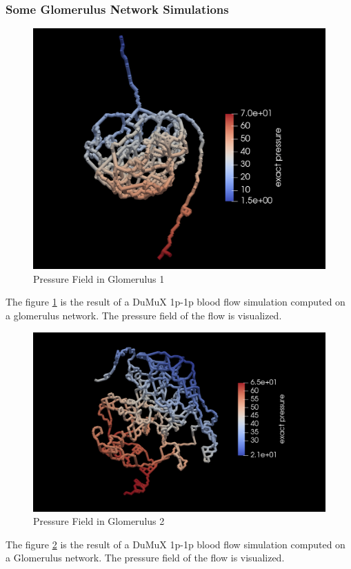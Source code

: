 \subsubsection*{Some Glomerulus Network Simulations}

\begin{figure}[h]
\centering
\includegraphics[width=162mm]{glom_pressure}
\caption{Pressure Field in Glomerulus 1}
\label{fig:glom_pressure}
\end{figure}
The figure \ref{fig:glom_pressure} is the result of a DuMuX 1p-1p blood flow simulation computed on a glomerulus network. The pressure field of the flow is visualized.\\

\begin{figure}[h]
\centering
\includegraphics[width=162mm]{glom2_pressure}
\caption{Pressure Field in Glomerulus 2}
\label{fig:glom2_pressure}
\end{figure}
The figure \ref{fig:glom2_pressure} is the result of a DuMuX 1p-1p blood flow simulation computed on a Glomerulus network. The pressure field of the flow is visualized.\\

